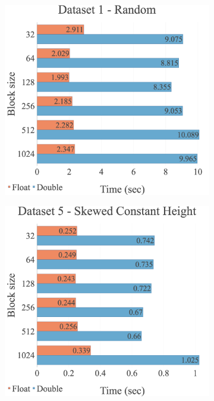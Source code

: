 \begin{figure}[H]
\centering
\begin{subfigure}{.49\textwidth}
  \centering
  \includegraphics[width=1\linewidth]{img/experiments/option-blocks-1_RAND.png}
\end{subfigure}
\begin{subfigure}{.49\textwidth}
  \centering
  \includegraphics[width=1\linewidth]{img/experiments/option-blocks-5_SKEWEDCONSTHEIGHT.png}

\end{subfigure}
\end{figure}
